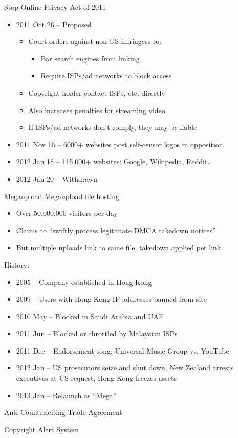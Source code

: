\documentclass{beamer}
\begin{document}
\begin{frame}{Stop Online Privacy Act of 2011}
\begin{itemize}
\item 2011 Oct 26 -- Proposed
\begin{itemize}
\item Court orders against non-US infringers to:
\begin{itemize}
\item Bar search engines from linking
\item Require ISPs/ad networks to block access
\end{itemize}
\item Copyright holder contact ISPs, etc. directly
\item Also increases penalties for streaming video
\item If ISPs/ad networks don't comply, they may be liable
\end{itemize}
\item 2011 Nov 16 -- 6000+ websites post self-censor logos in opposition
\item 2012 Jan 18 -- 115,000+ websites: Google, Wikipedia, Reddit\ldots
\item 2012 Jan 20 -- Withdrawn
\end{itemize}
\end{frame}

\begin{frame}{Megaupload}
Megaupload file hosting
\begin{itemize}
\item Over 50,000,000 visitors per day
\item Claims to ``swiftly process legitimate DMCA takedown notices''
\item But multiple uploads link to same file, takedown applied per link
\end{itemize}
History:
\begin{itemize}
\item 2005 -- Company established in Hong Kong
\item 2009 -- Users with Hong Kong IP addresses banned from site
\item 2010 May -- Blocked in Saudi Arabia and UAE
\item 2011 Jun -- Blocked or throttled by Malaysian ISPs
\item 2011 Dec -- Endorsement song; Universal Music Group vs. YouTube
\item 2012 Jan -- US prosecutors seize and shut down, New Zealand arrests executives at US request, Hong Kong freezes assets
\item 2013 Jan -- Relaunch as ``Mega''
\end{itemize}
\end{frame}

\begin{frame}{Anti-Counterfeiting Trade Agreement}
\end{frame}

\begin{frame}{Copyright Alert System}
\end{frame}
\end{document}
